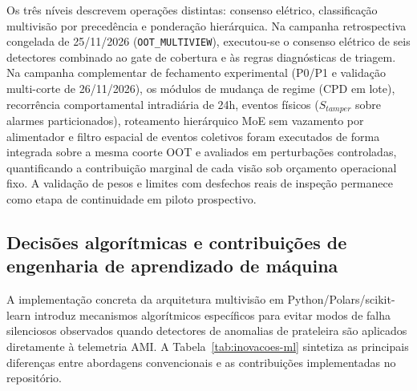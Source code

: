 Os três níveis descrevem operações distintas: consenso elétrico, classificação multivisão por precedência e ponderação hierárquica. Na campanha retrospectiva congelada de 25/11/2026 (\texttt{OOT\_MULTIVIEW}), executou-se o consenso elétrico de seis detectores combinado ao gate de cobertura e às regras diagnósticas de triagem. Na campanha complementar de fechamento experimental (P0/P1 e validação multi-corte de 26/11/2026), os módulos de mudança de regime (CPD em lote), recorrência comportamental intradiária de 24h, eventos físicos ($S_{tamper}$ sobre alarmes particionados), roteamento hierárquico MoE sem vazamento por alimentador e filtro espacial de eventos coletivos foram executados de forma integrada sobre a mesma coorte OOT e avaliados em perturbações controladas, quantificando a contribuição marginal de cada visão sob orçamento operacional fixo. A validação de pesos e limites com desfechos reais de inspeção permanece como etapa de continuidade em piloto prospectivo.

\subsection{Decisões algorítmicas e contribuições de engenharia de aprendizado de máquina}\label{inovacoes-ml-codigo}

A implementação concreta da arquitetura multivisão em Python/Polars/scikit-learn introduz mecanismos algorítmicos específicos para evitar modos de falha silenciosos observados quando detectores de anomalias de prateleira são aplicados diretamente à telemetria AMI. A Tabela~\ref{tab:inovacoes-ml} sintetiza as principais diferenças entre abordagens convencionais e as contribuições implementadas no repositório.

